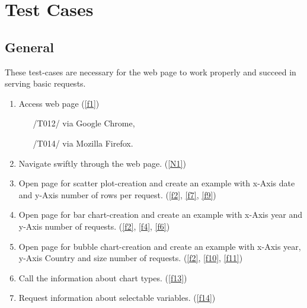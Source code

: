 \section{Test Cases}



\subsection{General}

These test-cases are necessary for the web page to work 
properly and succeed in serving basic requests.

\begin{enumerate}[label={{/T}\itemnumber*{/}}, series=test]

\item Access web page (\ref{f1})
\begin{enumerate}
  \item[/T012/] via Google Chrome,
  \item[/T014/] via Mozilla Firefox.
\end{enumerate}
\label{t10}

\item Navigate swiftly through the web page. (\ref{N1}) 
\label{t11}

\item Open page for \gls{scatter plot}-creation and create an example
      with x-Axis date and y-Axis number of rows per request. (\ref{f2}, \ref{f7}, \ref{f9})
\label{t12}

\item Open page for \gls{bar chart}-creation and create an example
      with x-Axis year and y-Axis number of requests. (\ref{f2},  \ref{f4}, \ref{f6})
\label{t13}

\item Open page for \gls{bubble chart}-creation and create an example
      with x-Axis year, y-Axis Country and size number of requests. (\ref{f2},  \ref{f10}, \ref{f11})
\label{t14}

\item Call the information about \gls{chart} types. (\ref{f13})
\label{t15}

\item Request information about selectable variables. (\ref{f14})
\label{t16}

\end{enumerate}

